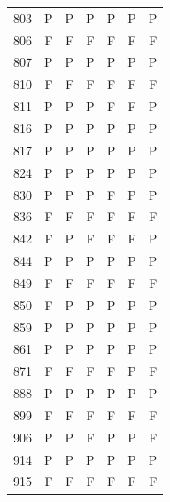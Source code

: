 \begin{table}[!htbp]
\begin{tabular*}{\textwidth}{@{\extracolsep{\fill}}rrrrrrr}
803 & P & P & P & P & P & P\\
806 & F & F & F & F & F & F\\
807 & P & P & P & P & P & P\\
810 & F & F & F & F & F & F\\
811 & P & P & P & F & F & P\\
816 & P & P & P & P & P & P\\
817 & P & P & P & P & P & P\\
824 & P & P & P & P & P & P\\
830 & P & P & P & F & P & P\\
836 & F & F & F & F & F & F\\
842 & F & P & F & F & F & P\\
844 & P & P & P & P & P & P\\
849 & F & F & F & F & F & F\\
850 & F & P & P & P & P & P\\
859 & P & P & P & P & P & P\\
861 & P & P & P & P & P & P\\
871 & F & F & F & F & P & F\\
888 & P & P & P & P & P & P\\
899 & F & F & F & F & F & F\\
906 & P & P & F & P & P & F\\
914 & P & P & P & P & P & P\\
915 & F & F & F & F & F & F\\
\bottomrule\end{tabular*}\end{table}
\clearpage
